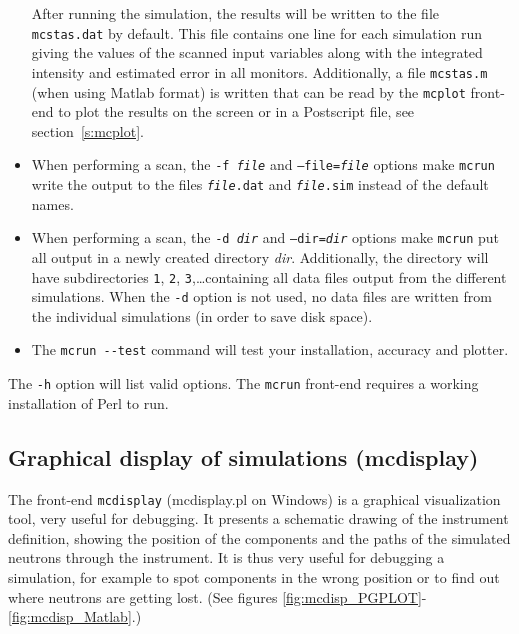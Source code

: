 \begin{itemize}
After running the simulation, the results will be written to the file
\verb+mcstas.dat+ by default. This file contains one line for each simulation
run giving the values of the scanned input variables along with the integrated
intensity and estimated error in all monitors. Additionally, a file
\verb+mcstas.m+ (when using Matlab format) is written that can be read by the
\verb+mcplot+ front-end to plot the results on the screen or in a Postscript
file, see section~\ref{s:mcplot}. 
\item When performing a scan, the \texttt{-f \textit{file}} and
  \texttt{--file=\textit{file}} options make \verb+mcrun+ write the output
  to the files \texttt{\textit{file\/}.dat} and \texttt{\textit{file\/}.sim}
  instead of the default names.
\item When performing a scan, the \texttt{-d \textit{dir}} and
  \texttt{--dir=\textit{dir}} options make \verb+mcrun+ put all output in a
  newly created directory \textit{dir}. Additionally, the directory will
  have subdirectories \verb+1+, \verb+2+, \verb+3+,\ldots containing all
  data files output from the different simulations. When the \verb+-d+
  option is not used, no data files are written from the individual
  simulations (in order to save disk space).
\item The \verb+mcrun --test+ command will test your \MCS installation,
  accuracy and plotter. 
\end{itemize}

The \verb+-h+ option will list valid options. The \verb+mcrun+ front-end
requires a working installation of Perl to run.


\subsection{Graphical display of simulations (mcdisplay)}
\label{s:mcdisplay}

The front-end \verb+mcdisplay+ (mcdisplay.pl on Windows) is a graphical
visualization tool, very useful for debugging.  It presents a schematic drawing
of the instrument definition, showing the position of the components and the
paths of the simulated neutrons through the instrument. It is thus very useful
for debugging a simulation, for example to spot components in the wrong position
or to find out where neutrons are getting lost.  (See figures
\ref{fig:mcdisp_PGPLOT}-\ref{fig:mcdisp_Matlab}.)

